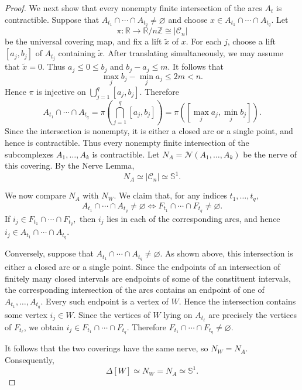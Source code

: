 \documentclass[12pt,reqno]{amsart}
\theoremstyle{definition}
\numberwithin{equation}{section}
\def\C{\mathcal{C}}
\begin{document}
\begin{proof}
	We next show that every nonempty finite intersection of the arcs
	$A_t$ is contractible. Suppose that
\( A_{t_1}\cap\cdots\cap A_{t_q}\neq\varnothing \)
	and choose \( x\in A_{t_1}\cap\cdots\cap A_{t_q}. \)
	Let
	\[
	\pi:\mathbb R\longrightarrow\mathbb R/n\mathbb Z
	\cong |\C_n|
	\]
	be the universal covering map, and fix a lift $\widetilde{x}$ of
	$x$. For each $j$, choose a lift $[a_j,b_j]$ of $A_{t_j}$ containing
	$\widetilde{x}$. After translating simultaneously, we may assume
	that $\widetilde{x}=0$. Thus \( a_j\leq0\leq b_j \) and \( b_j-a_j\leq m. \)
	It follows that
	\[
	\max_j b_j-\min_j a_j\leq2m<n.
	\]
	Hence $\pi$ is injective on \( \bigcup_{j=1}^{q}[a_j,b_j]. \)
	Therefore
	\[
	A_{t_1}\cap\cdots\cap A_{t_q}
	=
	\pi\left(
	\bigcap_{j=1}^{q}[a_j,b_j]
	\right)
	=
	\pi\left(
	\left[\max_j a_j,\min_j b_j\right]
	\right).
	\]
	Since the intersection is nonempty, it is either a closed arc or a
	single point, and hence is contractible. Thus every nonempty finite
	intersection of the subcomplexes $A_1,\ldots,A_k$ is contractible.
	Let \( N_A=\mathcal N(A_1,\ldots,A_k) \)
	be the nerve of this covering. By the Nerve Lemma,
	\[
	N_A\simeq|\C_n|\simeq\mathbb S^1.
	\]
	
	We now compare $N_A$ with $N_W$. We claim that, for any indices
	$t_1,\ldots,t_q$,
	\[
	A_{t_1}\cap\cdots\cap A_{t_q}\neq\varnothing
	\Longleftrightarrow
	F_{t_1}\cap\cdots\cap F_{t_q}\neq\varnothing.
	\]
	If \( i_j\in F_{t_1}\cap\cdots\cap F_{t_q}, \)
	then $i_j$ lies in each of the corresponding arcs, and hence \( 	i_j\in A_{t_1}\cap\cdots\cap A_{t_q}. \)

	
	Conversely, suppose that \( 	A_{t_1}\cap\cdots\cap A_{t_q}\neq\varnothing. \)
	As shown above, this intersection is either a closed arc or a single
	point. Since the endpoints of an intersection of finitely many
	closed intervals are endpoints of some of the constituent
	intervals, the corresponding intersection of the arcs contains an
	endpoint of one of $A_{t_1},\ldots,A_{t_q}$. Every such endpoint is
	a vertex of $W$. Hence the intersection contains some vertex
	$i_j\in W$. Since the vertices of $W$ lying on $A_{t_\ell}$ are
	precisely the vertices of $F_{t_\ell}$, we obtain \( 	i_j\in F_{t_1}\cap\cdots\cap F_{t_q}. \)
	Therefore \( 	F_{t_1}\cap\cdots\cap F_{t_q}\neq\varnothing. \)
	
	It follows that the two coverings have the same nerve, so \( N_W=N_A. \)
	Consequently,
	\[
	\Delta[W]\simeq N_W=N_A\simeq\mathbb S^1.
	\]
\end{proof}
\end{document}
